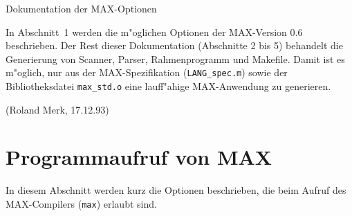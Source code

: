 

{\LARGE\bf\centerline{Dokumentation der MAX-Optionen}}
\bigskip\noindent
In Abschnitt~1 werden die m"oglichen Optionen der MAX-Version 0.6 beschrieben.
Der Rest dieser Dokumentation (Abschnitte 2 bis 5)
behandelt die Generierung von Scanner, Parser, Rahmenprogramm und Makefile.
Damit ist es m"oglich, nur aus der MAX-Spezifikation ({\tt LANG\_spec.m})
sowie der Bibliotheksdatei {\tt max\_std.o}
eine lauff"ahige MAX-Anwendung zu generieren.

\bigskip\noindent (Roland Merk, 17.12.93)

\vspace{2cm}
\tableofcontents
\newpage
\section{Programmaufruf von MAX}

In diesem Abschnitt werden kurz die Optionen beschrieben, die beim Aufruf des
MAX-Compilers ({\tt max}) erlaubt sind.

